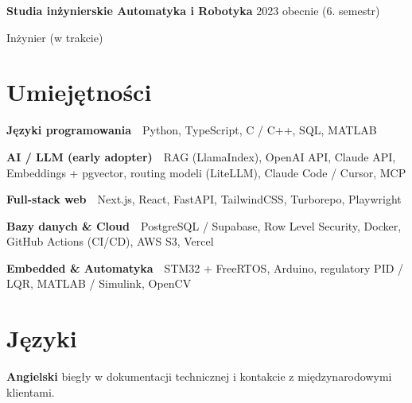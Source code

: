 \documentclass[11pt,a4paper]{article}
\newcommand{\skillrow}[2]{%
  \noindent\textbf{#1} \,\textemdash\, #2\par\vspace{2pt}
}
\begin{document}
\noindent\textbf{Studia inżynierskie \textemdash{} Automatyka i Robotyka}
\hfill {\small\color{muted}2023 \textemdash{} obecnie (6. semestr)}\par
Inżynier (w trakcie)

\section*{Umiejętności}

\skillrow{Języki programowania}{Python, TypeScript, C / C++, SQL, MATLAB}
\skillrow{AI / LLM (early adopter)}{RAG (LlamaIndex), OpenAI API, Claude API, Embeddings + pgvector, routing modeli (LiteLLM), Claude Code / Cursor, MCP}
\skillrow{Full-stack web}{Next.js, React, FastAPI, TailwindCSS, Turborepo, Playwright}
\skillrow{Bazy danych \& Cloud}{PostgreSQL / Supabase, Row Level Security, Docker, GitHub Actions (CI/CD), AWS S3, Vercel}
\skillrow{Embedded \& Automatyka}{STM32 + FreeRTOS, Arduino, regulatory PID / LQR, MATLAB / Simulink, OpenCV}

\section*{Języki}

\noindent\textbf{Angielski} \textemdash{} biegły w dokumentacji technicznej
i kontakcie z międzynarodowymi klientami.
\end{document}
